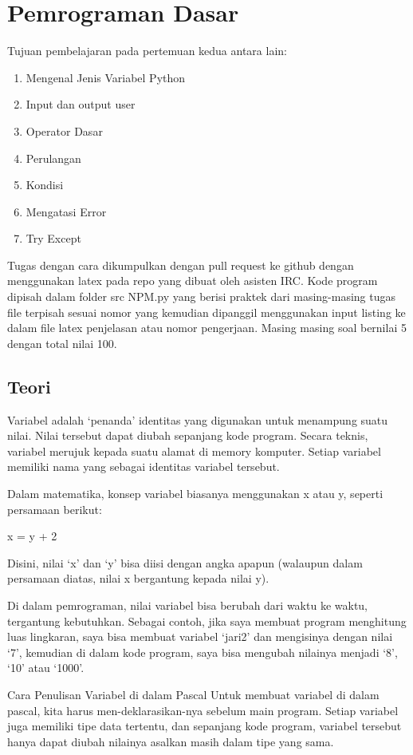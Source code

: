 \chapter{Pemrograman Dasar}
Tujuan pembelajaran pada pertemuan kedua antara lain:
\begin{enumerate}
\item
Mengenal Jenis Variabel Python
\item
Input dan output user
\item
Operator Dasar
\item
Perulangan
\item
Kondisi
\item
Mengatasi Error
\item
Try Except
\end{enumerate}
Tugas dengan cara dikumpulkan dengan pull request ke github dengan menggunakan latex pada repo yang dibuat oleh asisten IRC. Kode program dipisah dalam folder src NPM.py yang berisi praktek dari masing-masing tugas file terpisah sesuai nomor yang kemudian dipanggil menggunakan input listing ke dalam file latex penjelasan atau nomor pengerjaan. Masing masing soal bernilai 5 dengan total nilai 100.

\section{Teori}
Variabel adalah ‘penanda’ identitas yang digunakan untuk menampung suatu nilai. Nilai tersebut dapat diubah sepanjang kode program. Secara teknis, variabel merujuk kepada suatu alamat di memory komputer. Setiap variabel memiliki nama yang sebagai identitas variabel tersebut.

Dalam matematika, konsep variabel biasanya menggunakan x atau y, seperti persamaan berikut:

x = y + 2

Disini, nilai ‘x’ dan ‘y’ bisa diisi dengan angka apapun (walaupun dalam persamaan diatas, nilai x bergantung kepada nilai y).

Di dalam pemrograman, nilai variabel bisa berubah dari waktu ke waktu, tergantung kebutuhkan. Sebagai contoh, jika saya membuat program menghitung luas lingkaran, saya bisa membuat variabel ‘jari2’ dan mengisinya dengan nilai ‘7’, kemudian di dalam kode program, saya bisa mengubah nilainya menjadi ‘8’, ‘10’ atau ‘1000’.

Cara Penulisan Variabel di dalam Pascal
Untuk membuat variabel di dalam pascal, kita harus men-deklarasikan-nya sebelum main program. Setiap variabel juga memiliki tipe data tertentu, dan sepanjang kode program, variabel tersebut hanya dapat diubah nilainya asalkan masih dalam tipe yang sama.

